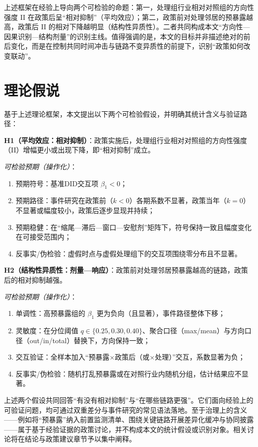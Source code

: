 上述框架在经验上导向两个可检验的命题：第一，处理组行业相对对照组的方向性强度 II 在政策后呈“相对抑制”（平均效应）；第二，政策前对处理邻居的预暴露越高，政策后 II 的相对下降越明显（结构性异质性）。二者共同构成本文“方向性—因果识别—结构剂量”的识别主线。值得强调的是，本文的目标并非描述绝对的前后变化，而是在控制共同时间冲击与链路不变异质性的前提下，识别“政策如何改变联动”。

\section{理论假说}
基于上述理论框架，本文提出以下两个可检验假设，并明确其统计含义与验证路径：

\noindent\textbf{H1（平均效应：相对抑制）}：政策实施后，处理组行业相对对照组的方向性强度（II）增幅更小或出现下降，即“相对抑制”成立。

\noindent\textit{可检验预期（操作化）}：
\begin{enumerate}
  \item 预期符号：基准DID交互项 $\beta_1<0$；
  \item 预期路径：事件研究在政策前（$k<0$）各期系数不显著，政策当年（$k=0$）不显著或幅度较小，政策后逐步显现并持续；
  \item 预期稳健：在“缩尾—滞后—窗口—安慰剂”矩阵下，符号保持一致且幅度变化在可接受范围内；
  \item 反事实/伪检验：虚假时点与虚假处理组下的交互项围绕零分布且不显著。
\end{enumerate}

\noindent\textbf{H2（结构性异质性：剂量—响应）}：政策前对处理邻居预暴露越高的链路，政策后的相对抑制越强。

\noindent\textit{可检验预期（操作化）}：
\begin{enumerate}
  \item 单调性：高预暴露组的 $\beta_1$ 更为负向（且显著），事件路径整体下移；
  \item 灵敏度：在分位阈值 $q\in\{0.25,0.30,0.40\}$、聚合口径（max/mean）与方向口径（out/in/total）替换下，方向保持一致；
  \item 交互验证：全样本加入“预暴露×政策后（或×处理）”交互，系数显著为负；
  \item 反事实/伪检验：随机打乱预暴露或在对照行业内随机分组，估计结果应不显著。
\end{enumerate}

上述两个假设共同回答“有没有相对抑制”与“在哪些链路更强”。它们面向经验上的可验证问题，均可通过双重差分与事件研究的常见语法落地。至于治理上的含义——例如将“预暴露”纳入前置监测清单、围绕关键链路开展差异化缓冲与协同披露——属于基于经验证据的政策讨论，并不构成本文的统计假设或识别对象。相关讨论将在结论与政策建议章节予以集中阐释。

